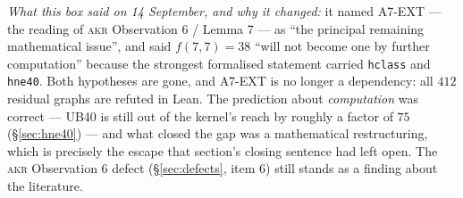 \documentclass[11pt,a4paper]{article}
\theoremstyle{plain}
\theoremstyle{definition}
\theoremstyle{remark}
\begin{document}
\begin{center}
{{\emph{What this box said on 14 September, and why it changed:} it named
\textsf{A7-EXT} --- the reading of \textsc{akr} Observation 6 / Lemma 7 --- as
``the principal remaining mathematical issue'', and said $f(7,7)=38$ ``will not
become one by further computation'' because the strongest formalised statement
carried \texttt{hclass} and \texttt{hne40}. Both hypotheses are gone, and
\textsf{A7-EXT} is no longer a dependency: all $412$ residual graphs are refuted
in Lean. The prediction about \emph{computation} was correct --- \textsf{UB40}
is still out of the kernel's reach by roughly a factor of $75$
(\S\ref{sec:hne40}) --- and what closed the gap was a mathematical
restructuring, which is precisely the escape that section's closing sentence had
left open. The \textsc{akr} Observation 6 defect (\S\ref{sec:defects}, item 6)
still stands as a finding about the literature.
}}
\end{center}



\end{document}

